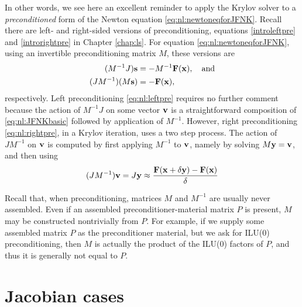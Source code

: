 In other words, we see here an excellent reminder to apply the Krylov solver to a \emph{preconditioned} form of the Newton equation \eqref{eq:nl:newtoneqforJFNK}.  Recall there are left- and right-sided versions of preconditioning, equations \eqref{introleftpre} and \eqref{introrightpre} in Chapter \ref{chap:ls}.  For equation \eqref{eq:nl:newtoneqforJFNK}, using an invertible preconditioning matrix $M$, these versions are
\begin{align}
(M^{-1} J) \mathbf{s} &= - M^{-1} \mathbf{F}(\mathbf{x}), \quad \text{and} \label{eq:nl:leftpre} \\
(J M^{-1}) (M \mathbf{s}) &= - \mathbf{F}(\mathbf{x}), \label{eq:nl:rightpre}
\end{align}
respectively.  Left preconditioning \eqref{eq:nl:leftpre} requires no further comment because the action of $M^{-1} J$ on some vector $\mathbf{v}$ is a straightforward composition of \eqref{eq:nl:JFNKbasic} followed by application of $M^{-1}$.  However, right preconditioning \eqref{eq:nl:rightpre}, in a Krylov iteration, uses a two step process.  The action of $J M^{-1}$ on $\mathbf{v}$ is computed by first applying $M^{-1}$ to $\mathbf{v}$, namely by solving $M \mathbf{y} = \mathbf{v}$, and then using
\begin{equation}
(J M^{-1}) \mathbf{v} = J \mathbf{y} \approx \frac{\mathbf{F}(\mathbf{x}+\delta \mathbf{y}) - \mathbf{F}(\mathbf{x})}{\delta} \label{eq:nl:JFNKwithrightpre}
\end{equation}

Recall that, when preconditioning, matrices $M$ and $M^{-1}$ are usually never assembled.  Even if an assembled preconditioner-material matrix $P$ is present, $M$ may be constructed nontrivially from $P$.  For example, if we supply some assembled matrix $P$ as the preconditioner material, but we ask for ILU($0$) preconditioning, then $M$ is actually the product of the ILU($0$) factors of $P$, and thus it is generally not equal to $P$.


\section{Jacobian cases} \label{sec:jacobiancases}

\def\checkmark{\tikz\fill[scale=0.4](0,.35) -- (.25,0) -- (.7,.8) -- (.25,.15) -- cycle;}
\def\bigcheckmark{\tikz\fill[scale=0.6](0,.35) -- (.25,0) -- (.7,.8) -- (.25,.15) -- cycle;}

